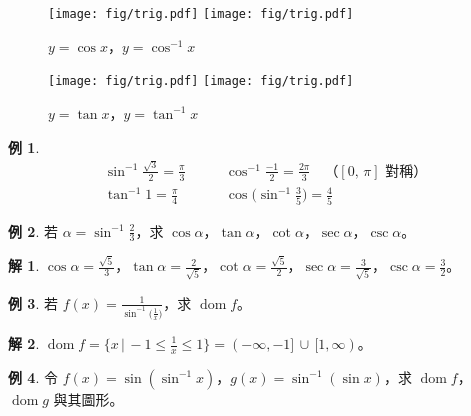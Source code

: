 \documentclass[12pt]{extarticle}
\newcommand{\ds}{\displaystyle}
\DeclareMathOperator*{\dom}{dom}
\theoremstyle{definition}
\newtheorem*{ex}{例}
\newtheorem*{sol}{解}
\begin{document}
\vspace{-1cm}
\begin{figure}[!htbp]
  \centering
  \texttt{[image: fig/trig.pdf]}
  \texttt{[image: fig/trig.pdf]}
  \caption{$y = \cos x$，$y = \cos^{-1} x$}
\end{figure}

\vspace{-1cm}
\begin{figure}[!htbp]
  \centering
  \texttt{[image: fig/trig.pdf]}
  \texttt{[image: fig/trig.pdf]}
  \caption{$y = \tan x$，$y = \tan^{-1} x$}
\end{figure}

\newpage

\begin{ex} 
  \begin{align*}
    &\sin^{-1}\frac{\sqrt{3}}{2} = \frac{\pi}{3}\qquad &\cos^{-1}\frac{-1}{2} = \frac{2\pi}{3}\quad\text{（$[0,\,\pi]$ 對稱）}\\
    &\tan^{-1}1 = \frac{\pi}{4}\qquad&\cos\big(\sin^{-1}\frac{3}{5}\big) = \frac{4}{5}\qquad\qquad
  \end{align*}
\end{ex}

\begin{ex}
  若 $\ds\alpha = \sin^{-1}\frac{2}{3}$，求 $\cos\alpha$，$\tan\alpha$，$\cot\alpha$，$\sec\alpha$，$\csc\alpha$。
\end{ex}

\begin{sol}
  $\ds\cos\alpha = \frac{\sqrt{5}}{3}$，$\ds\tan\alpha = \frac{2}{\sqrt{5}}$，$\ds\cot\alpha = \frac{\sqrt{5}}{2}$，$\ds\sec\alpha = \frac{3}{\sqrt{5}}$，$\ds\csc\alpha = \frac{3}{2}$。
\end{sol}

\begin{ex}
  若 $\ds f(x) = \frac{1}{\sin^{-1}\big(\frac{1}{x}\big)}$，求 $\dom{f}$。
\end{ex}

\begin{sol}
  $\dom f = \big\{x\,|\, -1\leqslant\frac{1}{x}\leqslant 1\big\} = (-\infty,-1]\,\cup\,[1,\infty)$。
\end{sol}

\begin{ex}
  令 $\ds f(x) = \sin(\sin^{-1} x)$，$\ds g(x) = \sin^{-1}(\sin x)$，求 $\dom{f}$，$\dom{g}$ 與其圖形。
\end{ex}
\end{document}
